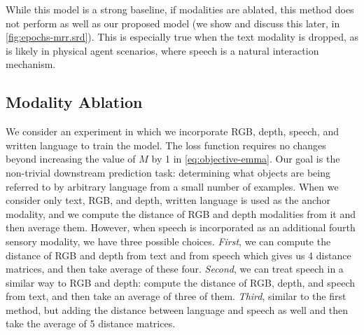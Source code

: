 \documentclass[sigconf,natbib=true,anonymous=true]{acmart}
\begin{document}
While this model is a strong baseline, if modalities are ablated, this method does not perform as well as our proposed model (we show and discuss this later, in \cref{fig:epochs-mrr.srd}). This is especially true when the text modality is dropped, as is likely in physical agent scenarios, where speech is a natural interaction mechanism.


\subsection{Modality Ablation}
We consider an experiment in which we incorporate RGB, depth, speech, and written language to train the model. The loss function requires no changes beyond increasing the value of $M$ by 1 in \cref{eq:objective-emma}. Our goal is the non-trivial downstream prediction task: determining what objects are being referred to by arbitrary language from a small number of examples. When we consider only text, RGB, and depth, written language is used as the anchor modality, and we compute the distance of RGB and depth modalities from it and then average them. However, when speech is incorporated as an additional fourth sensory modality, we have three possible choices. \textit{First}, we can compute the distance of RGB and depth from text and from speech which gives us 4 distance matrices, and then take average of these four. \textit{Second}, we can treat speech in a similar way to RGB and depth: compute the distance of RGB, depth, and speech from text, and then take an average of three of them. \textit{Third}, similar to the first method, but adding the distance between language and speech as well and then take the average of 5 distance matrices.
\end{document}
